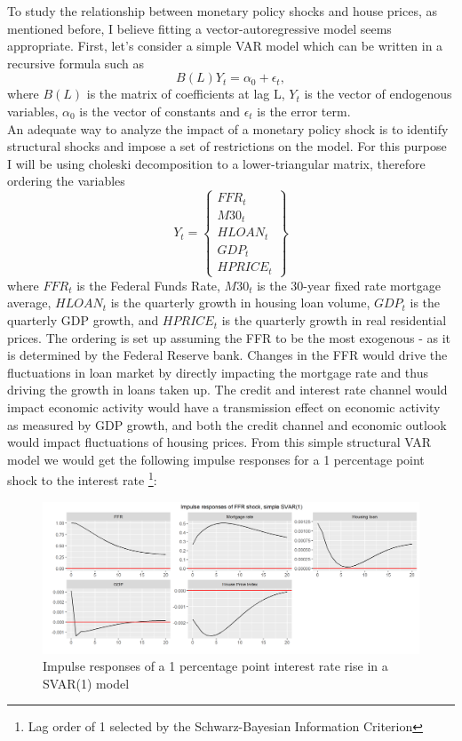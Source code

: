 \documentclass[12pt,a4paper]{article}
\begin{document}
To study the relationship between monetary policy shocks and house prices, as mentioned before, I believe fitting a vector-autoregressive model seems appropriate. First, let's consider a simple VAR model which can be written in a recursive formula such as
\begin{equation}
	B(L)Y_{t} = \alpha_{0} + \epsilon_{t},
\end{equation}
where  $B(L)$ is the matrix of coefficients at lag L, $Y_{t}$ is the vector of endogenous variables, $\alpha_{0}$ is the vector of constants and $\epsilon_{t}$ is the error term.\\
An adequate way to analyze the impact of a monetary policy shock is to identify structural shocks and impose a set of restrictions on the model. For this purpose I will be using choleski decomposition to a lower-triangular matrix, therefore ordering the variables
\begin{equation}
	Y_{t} = 
	\begin{Bmatrix}
		FFR_{t} \\
		M30_{t} \\
		HLOAN_{t} \\
		GDP_{t} \\
		HPRICE_{t}
	\end{Bmatrix}
\end{equation}
where $FFR_{t}$ is the Federal Funds Rate, $M30_{t}$ is the 30-year fixed rate mortgage average, $HLOAN_{t}$ is the quarterly growth in housing loan volume, $GDP_{t}$ is the quarterly GDP growth, and $HPRICE_{t}$ is the quarterly growth in real residential prices. The ordering is set up assuming the FFR to be the most exogenous - as it is determined by the Federal Reserve bank. Changes in the FFR would drive the fluctuations in  loan market by directly impacting the mortgage rate and thus driving the growth in loans taken up. The credit and interest rate channel would impact economic activity would have a transmission effect on economic activity as measured by GDP growth, and both the credit channel and economic outlook would impact fluctuations of housing prices. From this simple structural VAR model we would get the following impulse responses for a 1 percentage point shock to the interest rate \footnote{Lag order of 1 selected by the Schwarz-Bayesian Information Criterion}:
 \begin{center}
	\begin{figure}[h!]
		\includegraphics[width = \textwidth]{svarirf.png}
		\caption{Impulse responses of a 1 percentage point interest rate rise in a SVAR(1) model}
	\end{figure}
\end{center}
\end{document}
